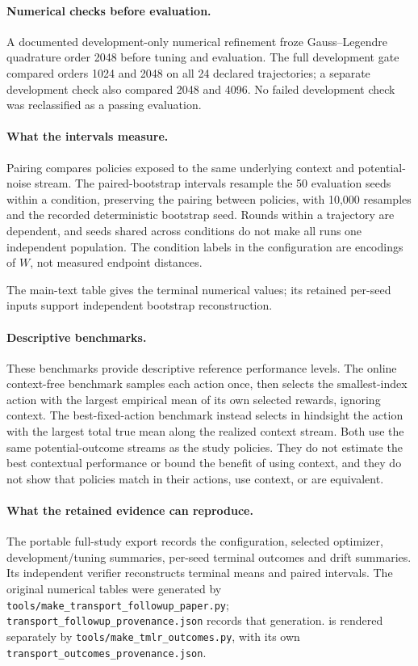 \paragraph{Numerical checks before evaluation.}
A documented development-only numerical refinement froze Gauss--Legendre
quadrature order 2048 before tuning and evaluation.  The full development gate
compared orders 1024 and 2048 on all 24 declared trajectories; a separate
development check also compared 2048 and 4096.  No failed development check was
reclassified as a passing evaluation.

\paragraph{What the intervals measure.}
Pairing compares policies exposed to the same underlying context and
potential-noise stream.
The paired-bootstrap intervals resample the 50 evaluation seeds within a
condition, preserving the pairing between policies, with 10,000 resamples and
the recorded deterministic bootstrap seed. Rounds within a trajectory are
dependent, and seeds shared across conditions do not make all runs one
independent population. The condition labels in the configuration are
encodings of $W$, not measured endpoint distances.

The main-text table gives the terminal numerical values; its retained per-seed
inputs support independent bootstrap reconstruction.

\paragraph{Descriptive benchmarks.}
These benchmarks provide descriptive reference performance levels.
The online context-free benchmark samples each action once, then selects the
smallest-index action with the largest empirical mean of its own selected
rewards, ignoring context.  The best-fixed-action benchmark instead selects in
hindsight the action with the largest total true mean along the realized
context stream.  Both use the same potential-outcome streams as the study policies.
They do not estimate the best contextual performance or bound the benefit of
using context, and they do not show that policies match in their actions, use
context, or are equivalent.

\paragraph{What the retained evidence can reproduce.}
The portable full-study export records the configuration, selected optimizer,
development/tuning summaries, per-seed terminal outcomes and drift summaries.
Its independent verifier reconstructs terminal means and paired intervals.
The original numerical tables were generated by
\texttt{tools/make\_transport\_followup\_paper.py};
\texttt{transport\_followup\_provenance.json} records that generation.
 is rendered separately by
\texttt{tools/make\_tmlr\_outcomes.py}, with its own
\texttt{transport\_outcomes\_provenance.json}.

